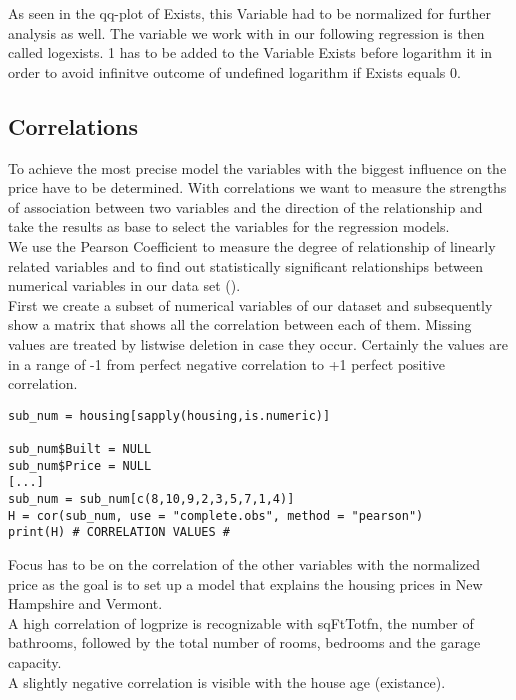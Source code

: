 As seen in the qq-plot of Exists, this Variable had to be normalized for further analysis as well. The variable we work with in our following regression is then called logexists. 1 has to be added to the Variable Exists before logarithm it in order to avoid infinitve outcome of undefined logarithm if Exists equals 0. \\




\subsection{Correlations}

To achieve the most precise model the variables with the biggest influence on the price have to be determined. With correlations we want to measure the strengths of association between two variables and the direction of the relationship and take the results as base to select the variables for the regression models. \\
We use the Pearson Coefficient to measure the degree of relationship of linearly related variables and to find out statistically significant relationships between numerical variables in our data set (\cite{correlation}). \\  %
First we create a subset of numerical variables of our dataset and subsequently show a matrix that shows all the correlation between each of them. Missing values are treated by listwise deletion in case they occur. Certainly the values are in a range of -1 from perfect negative correlation to +1 perfect positive correlation. \\


\begin{lstlisting}[frame = single,backgroundcolor=\color{hellgelb}]
sub_num = housing[sapply(housing,is.numeric)]

sub_num$Built = NULL
sub_num$Price = NULL
[...]
sub_num = sub_num[c(8,10,9,2,3,5,7,1,4)]
H = cor(sub_num, use = "complete.obs", method = "pearson")
print(H) # CORRELATION VALUES #
\end{lstlisting}

Focus has to be on the correlation of the other variables with the normalized price as the goal is to set up a model that explains the housing prices in New Hampshire and Vermont. \\

A high correlation of logprize is recognizable with sqFtTotfn, the number of bathrooms, followed by the total number of rooms, bedrooms and the garage capacity. \\
A slightly negative correlation is visible with the house age (existance).\\

